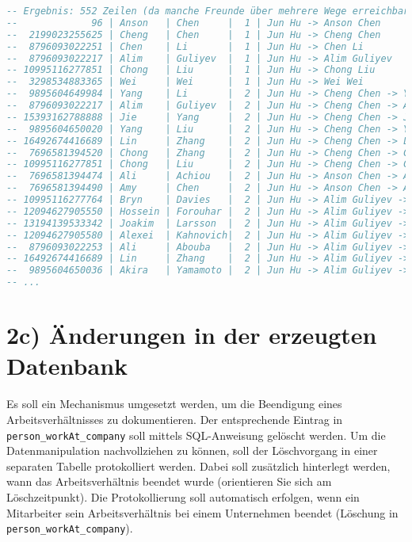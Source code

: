 \begin{lstlisting}[language=sql]
-- Ergebnis: 552 Zeilen (da manche Freunde über mehrere Wege erreichbar sind!)
--             96 | Anson   | Chen     |  1 | Jun Hu -> Anson Chen
--  2199023255625 | Cheng   | Chen     |  1 | Jun Hu -> Cheng Chen
--  8796093022251 | Chen    | Li       |  1 | Jun Hu -> Chen Li
--  8796093022217 | Alim    | Guliyev  |  1 | Jun Hu -> Alim Guliyev
-- 10995116277851 | Chong   | Liu      |  1 | Jun Hu -> Chong Liu
--  3298534883365 | Wei     | Wei      |  1 | Jun Hu -> Wei Wei
--  9895604649984 | Yang    | Li       |  2 | Jun Hu -> Cheng Chen -> Yang Li
--  8796093022217 | Alim    | Guliyev  |  2 | Jun Hu -> Cheng Chen -> Alim Guliyev
-- 15393162788888 | Jie     | Yang     |  2 | Jun Hu -> Cheng Chen -> Jie Yang
--  9895604650020 | Yang    | Liu      |  2 | Jun Hu -> Cheng Chen -> Yang Liu
-- 16492674416689 | Lin     | Zhang    |  2 | Jun Hu -> Cheng Chen -> Lin Zhang
--  7696581394520 | Chong   | Zhang    |  2 | Jun Hu -> Cheng Chen -> Chong Zhang
-- 10995116277851 | Chong   | Liu      |  2 | Jun Hu -> Cheng Chen -> Chong Liu
--  7696581394474 | Ali     | Achiou   |  2 | Jun Hu -> Anson Chen -> Ali Achiou
--  7696581394490 | Amy     | Chen     |  2 | Jun Hu -> Anson Chen -> Amy Chen
-- 10995116277764 | Bryn    | Davies   |  2 | Jun Hu -> Alim Guliyev -> Bryn Davies
-- 12094627905550 | Hossein | Forouhar |  2 | Jun Hu -> Alim Guliyev -> Hossein Forouhar
-- 13194139533342 | Joakim  | Larsson  |  2 | Jun Hu -> Alim Guliyev -> Joakim Larsson
-- 12094627905580 | Alexei  | Kahnovich|  2 | Jun Hu -> Alim Guliyev -> Alexei Kahnovich
--  8796093022253 | Ali     | Abouba   |  2 | Jun Hu -> Alim Guliyev -> Ali Abouba
-- 16492674416689 | Lin     | Zhang    |  2 | Jun Hu -> Alim Guliyev -> Lin Zhang
--  9895604650036 | Akira   | Yamamoto |  2 | Jun Hu -> Alim Guliyev -> Akira Yamamoto
-- ...
\end{lstlisting}

\newpage
\section*{2c) Änderungen in der erzeugten Datenbank}
Es soll ein Mechanismus umgesetzt werden, um die Beendigung eines Arbeitsverhältnisses zu dokumentieren.
Der entsprechende Eintrag in \texttt{person\_workAt\_company} soll mittels SQL-Anweisung gelöscht werden.
Um die Datenmanipulation nachvollziehen zu können, soll der Löschvorgang in einer separaten Tabelle protokolliert werden.
Dabei soll zusätzlich hinterlegt werden, wann das Arbeitsverhältnis beendet wurde (orientieren Sie sich am Löschzeitpunkt).
Die Protokollierung soll automatisch erfolgen, wenn ein Mitarbeiter sein Arbeitsverhältnis bei einem Unternehmen beendet (Löschung in \texttt{person\_workAt\_company}).

